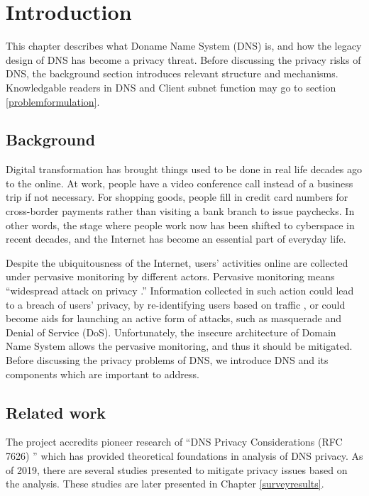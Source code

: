 \documentclass[a4paper,12pt]{article}
\begin{document}
%
%

\section{Introduction}
This chapter describes what Doname Name System (DNS) is, and how the legacy design of DNS has become a privacy threat. Before discussing the privacy risks of DNS, the background section introduces relevant structure and mechanisms. Knowledgable readers in DNS and Client subnet function may go to section \ref{problemformulation}.

\subsection{Background}
Digital transformation has brought things used to be done in real life decades ago to the online. At work, people have a video conference call instead of a business trip if not necessary. For shopping goods, people fill in credit card numbers for cross-border payments rather than visiting a bank branch to issue paychecks. In other words, the stage where people work now has been shifted to cyberspace in recent decades, and the Internet has become an essential part of everyday life.

Despite the ubiquitousness of the Internet, users' activities online are collected under pervasive monitoring by different actors.
Pervasive monitoring means ``widespread attack on privacy \cite{rfc7258}.'' Information collected in such action could lead to a breach of users’ privacy, by re-identifying users based on traffic \cite{herrmann2010analyzing}, or could become aids for launching an active form of attacks, such as masquerade and Denial of Service (DoS).
Unfortunately, the insecure architecture of Domain Name System allows the pervasive monitoring, and thus it should be mitigated. Before discussing the privacy problems of DNS, we introduce DNS and its components which are important to address.



\subsection{Related work}
The project accredits pioneer research of ``DNS Privacy Considerations (RFC 7626) \cite{rfc7626}'' which has provided theoretical foundations in analysis of DNS privacy. 
As of 2019, there are several studies presented to mitigate privacy issues based on the analysis. These studies are later presented in Chapter \ref{surveyresults}.
\end{document}
